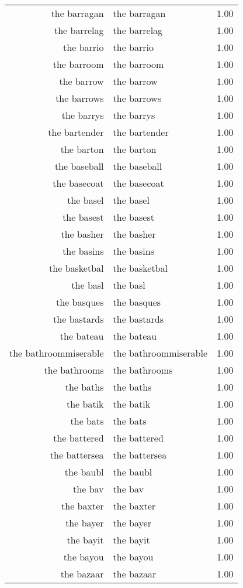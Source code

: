 \begin{table}[ht]
\begin{tabular}{rlr}
  the barragan & the barragan & 1.00 \\ 
  the barrelag & the barrelag & 1.00 \\ 
  the barrio & the barrio & 1.00 \\ 
  the barroom & the barroom & 1.00 \\ 
  the barrow & the barrow & 1.00 \\ 
  the barrows & the barrows & 1.00 \\ 
  the barrys & the barrys & 1.00 \\ 
  the bartender & the bartender & 1.00 \\ 
  the barton & the barton & 1.00 \\ 
  the baseball & the baseball & 1.00 \\ 
  the basecoat & the basecoat & 1.00 \\ 
  the basel & the basel & 1.00 \\ 
  the basest & the basest & 1.00 \\ 
  the basher & the basher & 1.00 \\ 
  the basins & the basins & 1.00 \\ 
  the basketbal & the basketbal & 1.00 \\ 
  the basl & the basl & 1.00 \\ 
  the basques & the basques & 1.00 \\ 
  the bastards & the bastards & 1.00 \\ 
  the bateau & the bateau & 1.00 \\ 
  the bathroommiserable & the bathroommiserable & 1.00 \\ 
  the bathrooms & the bathrooms & 1.00 \\ 
  the baths & the baths & 1.00 \\ 
  the batik & the batik & 1.00 \\ 
  the bats & the bats & 1.00 \\ 
  the battered & the battered & 1.00 \\ 
  the battersea & the battersea & 1.00 \\ 
  the baubl & the baubl & 1.00 \\ 
  the bav & the bav & 1.00 \\ 
  the baxter & the baxter & 1.00 \\ 
  the bayer & the bayer & 1.00 \\ 
  the bayit & the bayit & 1.00 \\ 
  the bayou & the bayou & 1.00 \\ 
  the bazaar & the bazaar & 1.00 \\ 

\end{tabular}
\end{table}
